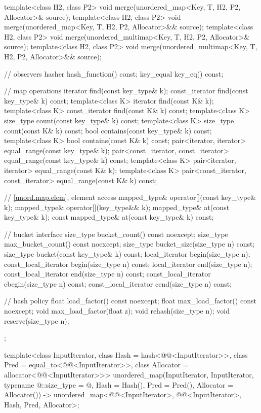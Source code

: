 \begin{codeblock}
{{    template<class H2, class P2>
      void merge(unordered_map<Key, T, H2, P2, Allocator>& source);
    template<class H2, class P2>
      void merge(unordered_map<Key, T, H2, P2, Allocator>&& source);
    template<class H2, class P2>
      void merge(unordered_multimap<Key, T, H2, P2, Allocator>& source);
    template<class H2, class P2>
      void merge(unordered_multimap<Key, T, H2, P2, Allocator>&& source);

    // observers
    hasher hash_function() const;
    key_equal key_eq() const;

    // map operations
    iterator         find(const key_type& k);
    const_iterator   find(const key_type& k) const;
    template<class K>
      iterator       find(const K& k);
    template<class K>
      const_iterator find(const K& k) const;
    template<class K>
    size_type        count(const key_type& k) const;
    template<class K>
      size_type      count(const K& k) const;
    bool             contains(const key_type& k) const;
    template<class K>
      bool           contains(const K& k) const;
    pair<iterator, iterator>               equal_range(const key_type& k);
    pair<const_iterator, const_iterator>   equal_range(const key_type& k) const;
    template<class K>
      pair<iterator, iterator>             equal_range(const K& k);
    template<class K>
      pair<const_iterator, const_iterator> equal_range(const K& k) const;

    // \ref{unord.map.elem}, element access
    mapped_type& operator[](const key_type& k);
    mapped_type& operator[](key_type&& k);
    mapped_type& at(const key_type& k);
    const mapped_type& at(const key_type& k) const;

    // bucket interface
    size_type bucket_count() const noexcept;
    size_type max_bucket_count() const noexcept;
    size_type bucket_size(size_type n) const;
    size_type bucket(const key_type& k) const;
    local_iterator begin(size_type n);
    const_local_iterator begin(size_type n) const;
    local_iterator end(size_type n);
    const_local_iterator end(size_type n) const;
    const_local_iterator cbegin(size_type n) const;
    const_local_iterator cend(size_type n) const;

    // hash policy
    float load_factor() const noexcept;
    float max_load_factor() const noexcept;
    void max_load_factor(float z);
    void rehash(size_type n);
    void reserve(size_type n);
  };

  template<class InputIterator,
           class Hash = hash<@@<InputIterator>>,
           class Pred = equal_to<@@<InputIterator>>,
           class Allocator = allocator<@@<InputIterator>>>
    unordered_map(InputIterator, InputIterator, typename @\seebelow@::size_type = @\seebelow@,
                  Hash = Hash(), Pred = Pred(), Allocator = Allocator())
      -> unordered_map<@@<InputIterator>, @@<InputIterator>, Hash, Pred,
                       Allocator>;

}
\end{codeblock}
